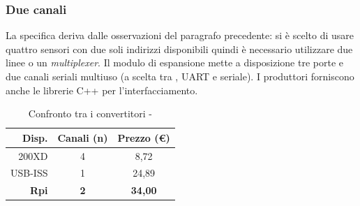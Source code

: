     \subsubsection{Due canali} \label{sssez:2canali}
    La specifica deriva dalle osservazioni del paragrafo precedente:
    si è scelto di usare quattro sensori con due soli indirizzi disponibili
    quindi è necessario utilizzare due linee o un \textit{multiplexer}.
    Il modulo di espansione \emph{} mette a disposizione
    tre porte \usb{} e due canali seriali multiuso
    (a scelta tra \iic{}, { UART} e seriale).
    I produttori forniscono anche le librerie { C++} per l'interfacciamento.
    
	\begin{table}
		\begin{center}
		\caption{Confronto tra i convertitori \iic-\usb}
		\label{tab:convertitori}
		\begin{tabular}{r c c}
Disp.        & Canali (n)  & Prezzo (\euro)\\
			\hline
200XD        &  4          & 8,72\\
USB-ISS      &  1          & 24,89\\
\textbf{Rpi} &  \textbf{2} & \textbf{34,00}\\
			\hline
		\end{tabular}
		\end{center}
	\end{table}

% 










